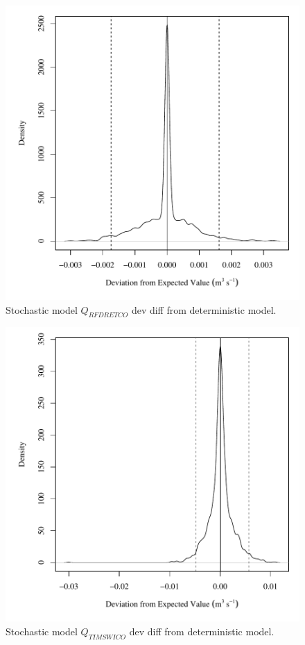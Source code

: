 \begin{center}
\begin{figure}[htbp]
	\includegraphics[width=6in]{"Figures/Results_USR/V dev diff qRFR"}
	\caption{Stochastic model $Q_{RFDRETCO}$ dev diff from deterministic model.}
\end{figure}
\end{center}
\newpage

\begin{center}
\begin{figure}[htbp]
	\includegraphics[width=6in]{"Figures/Results_USR/V dev diff qTIM"}
	\caption{Stochastic model $Q_{TIMSWICO}$ dev diff from deterministic model.}
\end{figure}
\end{center}
\newpage

